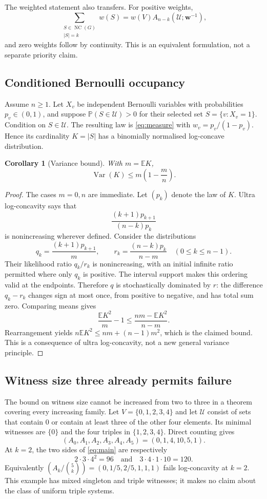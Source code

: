 \documentclass[11pt,a4paper]{article}
\newtheorem{corollary}[theorem]{Corollary}
\theoremstyle{remark}
\newcommand{\U}{\mathcal U}
\newcommand{\wt}{\boldsymbol w}
\begin{document}
The weighted statement also transfers. For positive weights,
\[
\sum_{\substack{S\in\operatorname{NC}(G)\\|S|=k}}w(S)
=w(V)A_{n-k}(\U;\wt^{-1}),
\]
and zero weights follow by continuity. This is an equivalent formulation, not a separate priority claim.

\subsection{Conditioned Bernoulli occupancy}

Assume $n\geq1$. Let $X_v$ be independent Bernoulli variables with probabilities $p_v\in(0,1)$, and suppose $\mathbb P(S\in\U)>0$ for their selected set $S=\{v:X_v=1\}$. Condition on $S\in\U$. The resulting law is \eqref{eq:measure} with $w_v=p_v/(1-p_v)$. Hence its cardinality $K=|S|$ has a binomially normalised log-concave distribution.

\begin{corollary}[Variance bound]\label{cor:variance}
With $m=\mathbb E K$,
\[
\operatorname{Var}(K)\leq m\left(1-\frac mn\right).
\]
\end{corollary}
\begin{proof}
The cases $m=0,n$ are immediate. Let $(p_k)$ denote the law of $K$. Ultra log-concavity says that
\[
\frac{(k+1)p_{k+1}}{(n-k)p_k}
\]
is nonincreasing wherever defined. Consider the distributions
\[
q_k=\frac{(k+1)p_{k+1}}{m},\qquad
r_k=\frac{(n-k)p_k}{n-m}\quad(0\leq k\leq n-1).
\]
Their likelihood ratio $q_k/r_k$ is nonincreasing, with an initial infinite ratio permitted where only $q_k$ is positive. The interval support makes this ordering valid at the endpoints. Therefore $q$ is stochastically dominated by $r$: the difference $q_k-r_k$ changes sign at most once, from positive to negative, and has total sum zero. Comparing means gives
\[
\frac{\mathbb E K^2}{m}-1
\leq\frac{nm-\mathbb E K^2}{n-m}.
\]
Rearrangement yields $n\mathbb E K^2\leq nm+(n-1)m^2$, which is the claimed bound. This is a consequence of ultra log-concavity, not a new general variance principle.
\end{proof}

\subsection{Witness size three already permits failure}

The bound on witness size cannot be increased from two to three in a theorem covering every increasing family. Let $V=\{0,1,2,3,4\}$ and let $\U$ consist of sets that contain $0$ or contain at least three of the other four elements. Its minimal witnesses are $\{0\}$ and the four triples in $\{1,2,3,4\}$. Direct counting gives
\[
(A_0,A_1,A_2,A_3,A_4,A_5)=(0,1,4,10,5,1).
\]
At $k=2$, the two sides of \eqref{eq:main} are respectively
\[
2\cdot3\cdot4^2=96
\quad\text{and}\quad
3\cdot4\cdot1\cdot10=120.
\]
Equivalently $(A_k/\binom5k)=(0,1/5,2/5,1,1,1)$ fails log-concavity at $k=2$. This example has mixed singleton and triple witnesses; it makes no claim about the class of uniform triple systems.
\end{document}
